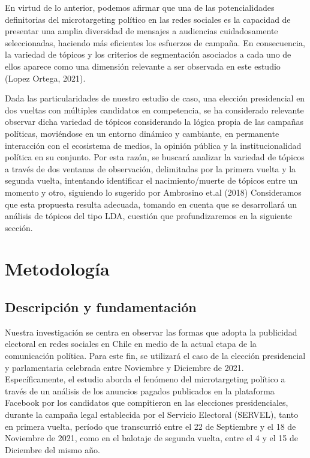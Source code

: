 \documentclass[
  10pt,
  letterpaper,
]{report}
\begin{document}
En virtud de lo anterior, podemos afirmar que una de las potencialidades
definitorias del microtargeting político en las redes sociales es la
capacidad de presentar una amplia diversidad de mensajes a audiencias
cuidadosamente seleccionadas, haciendo más eficientes los esfuerzos de
campaña. En consecuencia, la variedad de tópicos y los criterios de
segmentación asociados a cada uno de ellos aparece como una dimensión
relevante a ser observada en este estudio (Lopez Ortega, 2021).

Dada las particularidades de nuestro estudio de caso, una elección
presidencial en dos vueltas con múltiples candidatos en competencia, se
ha considerado relevante observar dicha variedad de tópicos considerando
la lógica propia de las campañas políticas, moviéndose en un entorno
dinámico y cambiante, en permanente interacción con el ecosistema de
medios, la opinión pública y la institucionalidad política en su
conjunto. Por esta razón, se buscará analizar la variedad de tópicos a
través de dos ventanas de observación, delimitadas por la primera vuelta
y la segunda vuelta, intentando identificar el nacimiento/muerte de
tópicos entre un momento y otro, siguiendo lo sugerido por Ambrosino
et.al (2018) Consideramos que esta propuesta resulta adecuada, tomando
en cuenta que se desarrollará un análisis de tópicos del tipo LDA,
cuestión que profundizaremos en la siguiente sección.

\newpage

\hypertarget{metodologuxeda}{%
\chapter{Metodología}\label{metodologuxeda}}

\hypertarget{descripciuxf3n-y-fundamentaciuxf3n}{%
\section{Descripción y
fundamentación}\label{descripciuxf3n-y-fundamentaciuxf3n}}

Nuestra investigación se centra en observar las formas que adopta la
publicidad electoral en redes sociales en Chile en medio de la actual
etapa de la comunicación política. Para este fin, se utilizará el caso
de la elección presidencial y parlamentaria celebrada entre Noviembre y
Diciembre de 2021. Específicamente, el estudio aborda el fenómeno del
microtargeting político a través de un análisis de los anuncios pagados
publicados en la plataforma Facebook por los candidatos que compitieron
en las elecciones presidenciales, durante la campaña legal establecida
por el Servicio Electoral (SERVEL), tanto en primera vuelta, período que
transcurrió entre el 22 de Septiembre y el 18 de Noviembre de 2021, como
en el balotaje de segunda vuelta, entre el 4 y el 15 de Diciembre del
mismo año.
\end{document}
